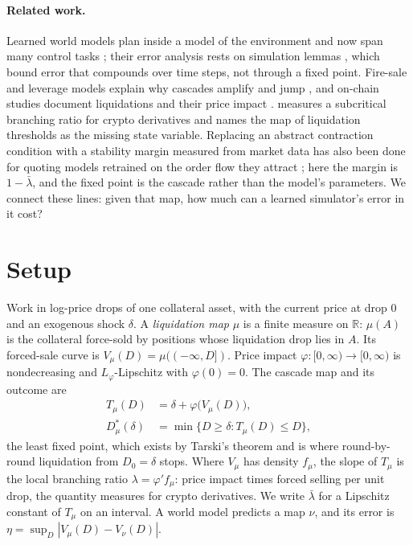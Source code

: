 \documentclass[letterpaper]{article} %
\theoremstyle{remark}
\newcommand{\Dstar}[1]{D^{\ast}_{#1}}
\newcommand{\Lp}{L_\varphi}
\newcommand{\lb}{\bar\lambda}
\newcommand{\R}{\mathbb{R}}
\begin{document}
\paragraph{Related work.} Learned world models plan inside a model of the environment \citep{ha2018recurrent} and now span many control tasks \citep{hafner2025dreamerv3}; their error analysis rests on simulation lemmas \citep{kearns2002nearoptimal,ross2011reduction}, which bound error that compounds over time steps, not through a fixed point. Fire-sale and leverage models explain why cascades amplify and jump \citep{brunnermeier2009liquidity,cifuentes2005liquidity,cao2023pricemediated}, and on-chain studies document liquidations and their price impact \citep{qin2021liquidations,lehar2022fragility}. \citet{garciaseuma2026engine} measures a subcritical branching ratio for crypto derivatives and names the map of liquidation thresholds as the missing state variable. Replacing an abstract contraction condition with a stability margin measured from market data has also been done for quoting models retrained on the order flow they attract \citep{nagarajan2026reflex}; here the margin is $1-\lb$, and the fixed point is the cascade rather than the model's parameters. We connect these lines: given that map, how much can a learned simulator's error in it cost?

\section{Setup}

Work in log-price drops of one collateral asset, with the current price at drop $0$ and an exogenous shock $\delta$.
A \emph{liquidation map} $\mu$ is a finite measure on $\R$: $\mu(A)$ is the collateral force-sold by positions whose liquidation drop lies in $A$. Its forced-sale curve is $V_\mu(D)=\mu((-\infty,D])$. Price impact $\varphi:[0,\infty)\to[0,\infty)$ is nondecreasing and $\Lp$-Lipschitz with $\varphi(0)=0$. The cascade map and its outcome are
\begin{align}
T_\mu(D)&=\delta+\varphi\big(V_\mu(D)\big),\nonumber\\
\Dstar{\mu}(\delta)&=\min\{D\ge\delta : T_\mu(D)\le D\},
\label{eq:lfp}
\end{align}
the least fixed point, which exists by Tarski's theorem and is where round-by-round liquidation from $D_0=\delta$ stops. Where $V_\mu$ has density $f_\mu$, the slope of $T_\mu$ is the local branching ratio $\lambda=\varphi' f_\mu$: price impact times forced selling per unit drop, the quantity \citet{garciaseuma2026engine} measures for crypto derivatives. We write $\lb$ for a Lipschitz constant of $T_\mu$ on an interval. A world model predicts a map $\nu$, and its error is $\eta=\sup_D|V_\mu(D)-V_\nu(D)|$.
\end{document}
